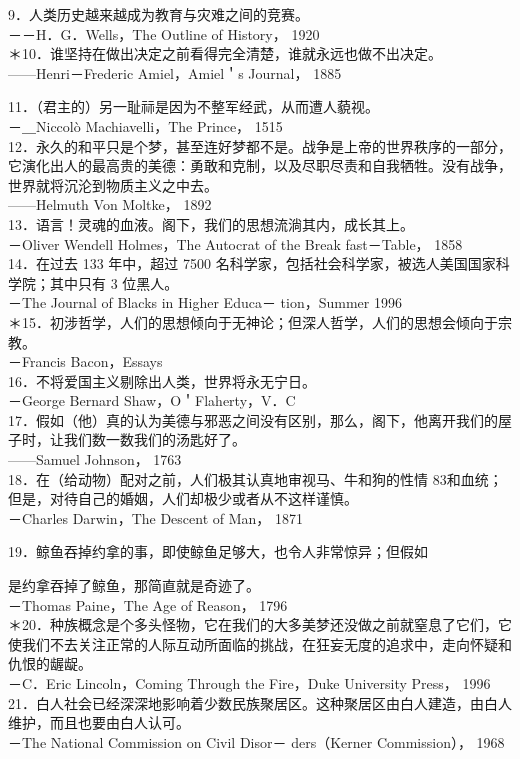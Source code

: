 9．人类历史越来越成为教育与灾难之间的竞赛。\\
－－H．G．Wells，The Outline of History， 1920\\
＊10．谁坚持在做出决定之前看得完全清楚，谁就永远也做不出决定。\\
——Henri－Frederic Amiel，Amiel＇s Journal， 1885

11．（君主的）另一耻祘是因为不整军经武，从而遭人藐视。\\
－＿Niccolò Machiavelli，The Prince， 1515\\
12．永久的和平只是个梦，甚至连好梦都不是。战争是上帝的世界秩序的一部分，它演化出人的最高贵的美德：勇敢和克制，以及尽职尽责和自我牺牲。没有战争，世界就将沉沦到物质主义之中去。\\
——Helmuth Von Moltke， 1892\\
13．语言！灵魂的血液。阁下，我们的思想流淌其内，成长其上。\\
－Oliver Wendell Holmes，The Autocrat of the Break fast－Table， 1858\\
14．在过去 133 年中，超过 7500 名科学家，包括社会科学家，被选人美国国家科学院；其中只有 3 位黑人。\\
－The Journal of Blacks in Higher Educa－ tion，Summer 1996\\
＊15．初涉哲学，人们的思想倾向于无神论；但深人哲学，人们的思想会倾向于宗教。\\
－Francis Bacon，Essays\\
16．不将爱国主义剔除出人类，世界将永无宁日。\\
－George Bernard Shaw，O＇Flaherty，V．C\\
17．假如（他）真的认为美德与邪恶之间没有区别，那么，阁下，他离开我们的屋子时，让我们数一数我们的汤匙好了。\\
——Samuel Johnson， 1763\\
18．在（给动物）配对之前，人们极其认真地审视马、牛和狗的性情 83和血统；但是，对待自己的婚姻，人们却极少或者从不这样谨慎。\\
－Charles Darwin，The Descent of Man， 1871

19．鲸鱼吞掉约拿的事，即使鲸鱼足够大，也令人非常惊异；但假如

是约拿吞掉了鲸鱼，那简直就是奇迹了。\\
－Thomas Paine，The Age of Reason， 1796\\
＊20．种族概念是个多头怪物，它在我们的大多美梦还没做之前就窒息了它们，它使我们不去关注正常的人际互动所面临的挑战，在狂妄无度的追求中，走向怀疑和仇恨的龌龊。\\
－C．Eric Lincoln，Coming Through the Fire，Duke University Press， 1996\\
21．白人社会已经深深地影响着少数民族聚居区。这种聚居区由白人建造，由白人维护，而且也要由白人认可。\\
－The National Commission on Civil Disor－ ders（Kerner Commission）， 1968


